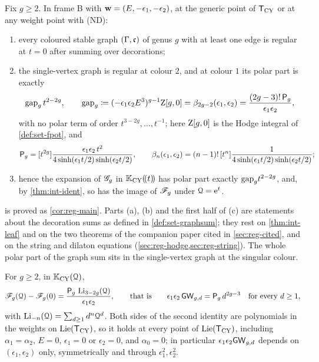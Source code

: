 \begin{thm}
\label{thm:int-reg}
Fix $g\geq2$. In frame B with $\mathbf{w}=(E,-\epsilon_1,-\epsilon_2)$, at the generic point of $\mathsf{T}_{\mathrm{CY}}$ or at any weight point with (ND):
\begin{enumerate}
\item[(a)] every coloured stable graph $(\Gamma,\mathfrak{c})$ of genus $g$ with at least one edge is regular at $t=0$ after summing over decorations;
\item[(b)] the single-vertex graph is regular at colour $2$, and at colour $1$ its polar part is exactly
\[
\mathrm{gap}_g\,t^{2-2g},\qquad \mathrm{gap}_g\coloneqq(-\epsilon_1\epsilon_2E^3)^{g-1}\mathrm{Z}[g,0]=\beta_{2g-2}(\epsilon_1,\epsilon_2)=\frac{(2g-3)!\,\mathsf{P}_{g}}{\epsilon_1\epsilon_2},
\]
with no polar term of order $t^{3-2g},\dots,t^{-1}$; here $\mathrm{Z}[g,0]$ is the Hodge integral of \cref{def:set-fpot}, and
\[
\mathsf{P}_{g}=[t^{2g}]\frac{\epsilon_1\epsilon_2\,t^2}{4\sinh(\epsilon_1t/2)\sinh(\epsilon_2t/2)},\qquad
\beta_n(\epsilon_1,\epsilon_2)=(n-1)!\,[t^n]\frac{1}{4\sinh(\epsilon_1t/2)\sinh(\epsilon_2t/2)} ;
\]
\item[(c)] hence the expansion of $\mathscr{G}_g$ in $\mathbb{K}_{\mathrm{CY}}(\!(t)\!)$ has polar part exactly $\mathrm{gap}_g t^{2-2g}$, and, by \cref{thm:int-ident}, so has the image of $\mathscr{F}_g$ under $\mathcal{Q}=\mathrm{e}^t$.
\end{enumerate}
\end{thm}

 is proved as \cref{cor:reg-main}. Parts (a), (b) and the first half of (c) are statements about the decoration sums as defined in \cref{def:set-graphsum}; they rest on \cref{thm:int-leaf} and on the two theorems of the companion paper \cite{LP2} cited in \cref{sec:reg-cited}, and on the string and dilaton equations (\cref{sec:reg-hodge,sec:reg-string}). The whole polar part of the graph sum sits in the single-vertex graph at the singular colour.

\begin{thm}
\label{thm:int-rig}
For $g\geq2$, in $\mathbb{K}_{\mathrm{CY}}(\mathcal{Q})$,
\[
\mathscr{F}_g(\mathcal{Q})-\mathscr{F}_g(0)=\frac{\mathsf{P}_{g}\,\operatorname{Li}_{3-2g}(\mathcal{Q})}{\epsilon_1\epsilon_2},\qquad\text{that is}\qquad \epsilon_1\epsilon_2\,\mathsf{GW}_{g,d}=\mathsf{P}_{g}\,d^{2g-3}\quad\text{for every }d\geq1,
\]
with $\operatorname{Li}_{-n}(\mathcal{Q})=\sum_{d\geq1}d^n\mathcal{Q}^d$. Both sides of the second identity are polynomials in the weights on $\mathrm{Lie}(\mathsf{T}_{\mathrm{CY}})$, so it holds at every point of $\mathrm{Lie}(\mathsf{T}_{\mathrm{CY}})$, including $\alpha_1=\alpha_2$, $E=0$, $\epsilon_1=0$ or $\epsilon_2=0$, and $\alpha_0=0$; in particular $\epsilon_1\epsilon_2\mathsf{GW}_{g,d}$ depends on $(\epsilon_1,\epsilon_2)$ only, symmetrically and through $\epsilon_1^2,\epsilon_2^2$.
\end{thm}

